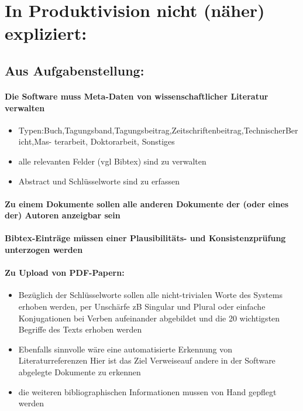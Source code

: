 \documentclass[a4paper,12pt]{article}
\begin{document}
\section{In Produktivision nicht (näher) expliziert:}

\subsection{Aus Aufgabenstellung:}

\paragraph{Die Software muss Meta-Daten von wissenschaftlicher Literatur verwalten}
\begin{itemize}
\item Typen:Buch,Tagungsband,Tagungsbeitrag,Zeitschriftenbeitrag,TechnischerBericht,Mas- terarbeit, Doktorarbeit, Sonstiges
\item alle relevanten Felder (vgl Bibtex) sind zu verwalten 
\item Abstract und Schlüsselworte sind zu erfassen 
\end{itemize} 
\paragraph{Zu einem Dokumente sollen alle anderen Dokumente der (oder eines der) Autoren anzeigbar sein}
\paragraph{Bibtex-Einträge müssen einer Plausibilitäts- und Konsistenzprüfung unterzogen werden}
\paragraph{Zu Upload von PDF-Papern:}
\begin{itemize}
\item Bezüglich der Schlüsselworte sollen alle nicht-trivialen Worte des Systems erhoben werden, per Unschärfe zB Singular und Plural oder einfache Konjugationen bei Verben aufeinander abgebildet und die 20 wichtigsten Begriffe des Texts erhoben werden
\item Ebenfalls sinnvolle wäre eine automatisierte Erkennung von Literaturreferenzen Hier ist das Ziel Verweiseauf andere in der Software abgelegte Dokumente zu erkennen
\item die weiteren bibliographischen Informationen mussen von Hand gepflegt werden
\end{itemize}
\end{document}
